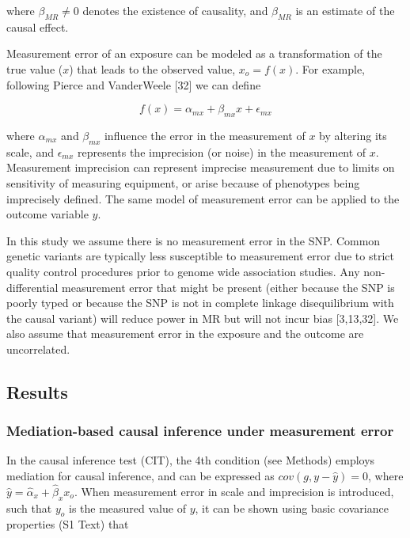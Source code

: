 \documentclass[]{article}
\begin{document}
where \(\beta_{MR} \neq 0\) denotes the existence of causality, and
\(\beta_{MR}\) is an estimate of the causal effect.

Measurement error of an exposure can be modeled as a transformation of
the true value (\(x\)) that leads to the observed value, \(x_o = f(x)\).
For example, following Pierce and VanderWeele {[}32{]} we can define

\[
f(x) = \alpha_{mx} + \beta_{mx} x + \epsilon_{mx}
\]

where \(\alpha_{mx}\) and \(\beta_{mx}\) influence the error in the
measurement of \(x\) by altering its scale, and \(\epsilon_{mx}\)
represents the imprecision (or noise) in the measurement of \(x\).
Measurement imprecision can represent imprecise measurement due to
limits on sensitivity of measuring equipment, or arise because of
phenotypes being imprecisely defined. The same model of measurement
error can be applied to the outcome variable \(y\).

In this study we assume there is no measurement error in the SNP. Common
genetic variants are typically less susceptible to measurement error due
to strict quality control procedures prior to genome wide association
studies. Any non-differential measurement error that might be present
(either because the SNP is poorly typed or because the SNP is not in
complete linkage disequilibrium with the causal variant) will reduce
power in MR but will not incur bias {[}3,13,32{]}. We also assume that
measurement error in the exposure and the outcome are uncorrelated.

\subsection{Results}\label{results}

\subsubsection{Mediation-based causal inference under measurement
error}\label{mediation-based-causal-inference-under-measurement-error}

In the causal inference test (CIT), the 4th condition (see Methods)
employs mediation for causal inference, and can be expressed as
\(cov(g, y - \hat{y}) = 0\), where
\(\hat{y} = \hat{\alpha}_x + \hat{\beta}_x x_o\). When measurement error
in scale and imprecision is introduced, such that \(y_o\) is the
measured value of \(y\), it can be shown using basic covariance
properties (S1 Text) that
\end{document}
